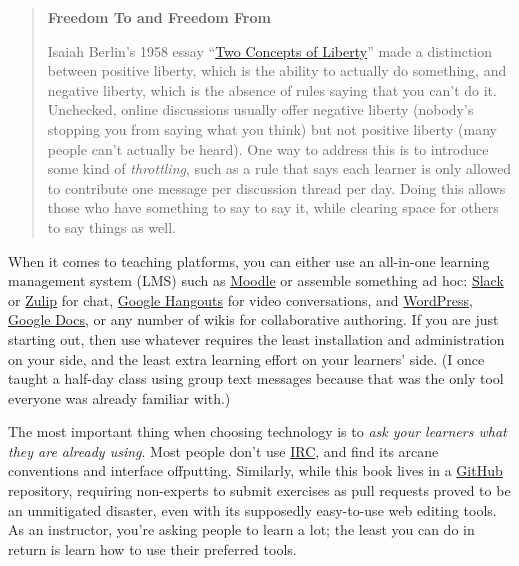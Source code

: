 \documentclass[10pt,statementpaper]{memoir}
\begin{document}
\begin{quote}
\textbf{Freedom To and Freedom From}

Isaiah Berlin's 1958 essay
``\href{https://en.wikipedia.org/wiki/Two_Concepts_of_Liberty}{Two
Concepts of Liberty}'' made a distinction between positive liberty,
which is the ability to actually do something, and negative liberty,
which is the absence of rules saying that you can't do it. Unchecked,
online discussions usually offer negative liberty (nobody's stopping you
from saying what you think) but not positive liberty (many people can't
actually be heard). One way to address this is to introduce some kind of
\emph{throttling}, such as a rule that says each learner is only allowed
to contribute one message per discussion thread per day. Doing this
allows those who have something to say to say it, while clearing space
for others to say things as well.
\end{quote}

When it comes to teaching platforms, you can either use an all-in-one
learning management system (LMS) such as
\href{http://moodle.org}{Moodle} or assemble something ad hoc:
\href{http://slack.com}{Slack} or \href{https://zulipchat.com/}{Zulip}
for chat, \href{http://hangouts.google.com}{Google Hangouts} for video
conversations, and \href{https://wordpress.org/}{WordPress},
\href{http://docs.google.com}{Google Docs}, or any number of wikis for
collaborative authoring. If you are just starting out, then use whatever
requires the least installation and administration on your side, and the
least extra learning effort on your learners' side. (I once taught a
half-day class using group text messages because that was the only tool
everyone was already familiar with.)

The most important thing when choosing technology is to \emph{ask your
learners what they are already using}. Most people don't use
\href{https://en.wikipedia.org/wiki/Internet_Relay_Chat}{IRC}, and find
its arcane conventions and interface offputting. Similarly, while this
book lives in a \href{http://github.com}{GitHub} repository, requiring
non-experts to submit exercises as pull requests proved to be an
unmitigated disaster, even with its supposedly easy-to-use web editing
tools. As an instructor, you're asking people to learn a lot; the least
you can do in return is learn how to use their preferred tools.
\end{document}
